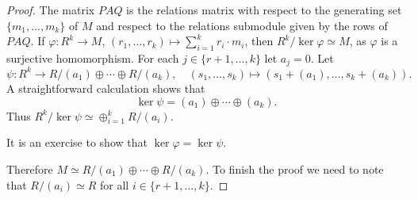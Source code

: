 \begin{proof}
	The matrix $PAQ$ is the relations matrix with respect to 
	the generating set $\{m_1,\dots,m_k\}$ of $M$ and respect to the relations submodule 
	given by the rows of $PAQ$.  If $\varphi\colon R^k\to
	M$, $(r_1,\dots,r_k)\mapsto \sum_{i=1}^k r_i\cdot m_i$, then 
	$R^k/\ker\varphi\simeq M$, as $\varphi$ is a surjective homomorphism. For each 
	$j\in\{r+1,\dots,k\}$ let $a_j=0$.  Let 
	\[
		\psi\colon R^k\to R/(a_1)\oplus\cdots\oplus R/(a_k),\quad
		(s_1,\dots,s_k)\mapsto (s_1+(a_1),\dots,s_k+(a_k)). 
	\]
	A straightforward calculation shows that 
	\[
		\ker\psi=(a_1)\oplus\cdots\oplus (a_k).
	\]
	Thus 
	$R^k/\ker\psi\simeq \oplus_{i=1}^k R/(a_i)$. 
	
	It is an exercise to show that $\ker\varphi=\ker\psi$. 
	

	Therefore $M\simeq R/(a_1)\oplus\cdots\oplus R/(a_k)$. To finish the proof
	we need to note that $R/(a_i)\simeq R$ for all $i\in\{r+1,\dots,k\}$. 
\end{proof}


